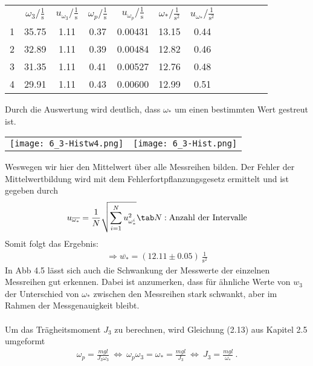 \begin{center}
    \begin{tabular}{gccccccccccc}
         &      $\omega_3/\frac{1}{\text{s}}$ &  $u_{\omega_3}/\frac{1}{\text{s}}$ &    $\omega_p/\frac{1}{\text{s}}$ &     $u_{\omega_p}/\frac{1}{\text{s}}$ &     $\omega_*/\frac{1}{\text{s}^2}$&  $u_{\omega_*}/\frac{1}{\text{s}^2}$\\
        1 &  35.75 &  1.11 &  0.37 &  0.00431 &  13.15 &  0.44 \\
        2 &  32.89 &  1.11 &  0.39 &  0.00484 &  12.82 &  0.46 \\
        3 &  31.35 &  1.11 &  0.41 &  0.00527 &  12.76 &  0.48 \\
        4 &  29.91 &  1.11 &  0.43 &  0.00600 &  12.99 &  0.51 \\
    \end{tabular}
\end{center}
Durch die Auswertung wird deutlich, dass $\omega_*$ um einen bestimmten Wert gestreut ist. 
\begin{center}
    \begin{tabular}{c c}
        \texttt{[image: 6\_3-Histw4.png]} & \texttt{[image: 6\_3-Hist.png]}
    \end{tabular}
\end{center}
Weswegen wir hier den Mittelwert über alle Messreihen bilden. Der Fehler der Mittelwertbildung wird mit dem Fehlerfortpflanzungsgesetz ermittelt und ist gegeben durch
\begin{align}
    u_{\overline{\omega_*}}=\frac{1}{N}\sqrt{\sum_{i=1}^{N} u_{\omega_*^i}^2}\tab N:\text{Anzahl der Intervalle}
\end{align}
Somit folgt das Ergebnis:
\begin{align*}
    \Rightarrow\boxed{\overline{w_*}=(12.11 \pm 0.05)~\frac{1}{\text{s}^2}}
\end{align*}
In Abb 4.5 lässt sich auch die Schwankung der Messwerte der einzelnen Messreihen gut erkennen. Dabei ist anzumerken, dass für ähnliche Werte von $w_3$ der Unterschied von $\omega_*$ zwischen den Messreihen stark schwankt, aber im Rahmen der Messgenauigkeit bleibt.\\ \\
Um das Trägheitsmoment $J_3$ zu berechnen, wird Gleichung (2.13) aus Kapitel 2.5 umgeformt
\begin{align}
    \omega_p = \frac{mgl}{J_3\omega_3}~\Leftrightarrow~\omega_p\omega_3 = \omega_* = \frac{mgl}{J_3}~\Leftrightarrow~J_3 = \frac{mgl}{\omega_*}~.
\end{align}
